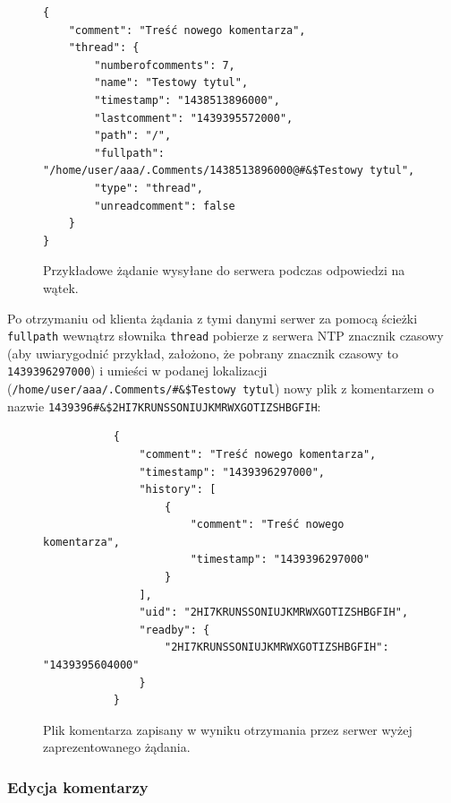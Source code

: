 \documentclass[polish,a4paper,twoside]{ppfcmthesis}
\begin{document}
\begin{figure}[htb!]
\label{newcommentrequest}
  \begin{verbatim}
{
    "comment": "Treść nowego komentarza", 
    "thread": {
        "numberofcomments": 7, 
        "name": "Testowy tytul", 
        "timestamp": "1438513896000", 
        "lastcomment": "1439395572000", 
        "path": "/", 
        "fullpath": "/home/user/aaa/.Comments/1438513896000@#&$Testowy tytul", 
        "type": "thread", 
        "unreadcomment": false
    }
}
  \end{verbatim}
  \caption{Przykładowe żądanie wysyłane do serwera podczas odpowiedzi na wątek.}
\end{figure}

Po otrzymaniu od klienta żądania z tymi danymi serwer za pomocą ścieżki \texttt{fullpath} wewnątrz słownika \texttt{thread} pobierze z serwera NTP znacznik czasowy (aby uwiarygodnić przykład, założono, że pobrany znacznik czasowy to \texttt{1439396297000}) i umieści w podanej lokalizacji (\texttt{/home/\-user/\-aaa/\-.Comments/\@\#\&\$Testowy tytul}) nowy plik z komentarzem o nazwie \texttt{1439396\@\#\&\$2HI7KRUNS\-SONIUJKM\-RWXGOTIZ\-SHBGFIH}:

\begin{figure}[htb]
\begin{verbatim}
           {
               "comment": "Treść nowego komentarza",
               "timestamp": "1439396297000",
               "history": [
                   {
                       "comment": "Treść nowego komentarza",
                       "timestamp": "1439396297000"
                   }
               ], 
               "uid": "2HI7KRUNSSONIUJKMRWXGOTIZSHBGFIH",
               "readby": {
                   "2HI7KRUNSSONIUJKMRWXGOTIZSHBGFIH": "1439395604000"
               }
           }
\end{verbatim}
  \caption{Plik komentarza zapisany w wyniku otrzymania przez serwer  wyżej zaprezentowanego żądania.}
\end{figure}

\subsubsection*{Edycja komentarzy}
\end{document}
